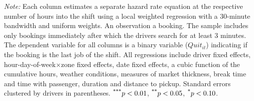 \documentclass[reviewmode]{restat}
\begin{document}
\begin{table}[]
	\begin{tablenotes}
		\small
        \textit{Note:} Each column estimates a separate hazard rate equation at the respective number of hours into the shift using a local weighted regression with a 30-minute bandwidth and uniform weights. An observation a booking. The sample includes only bookings immediately after which the drivers search for at least 3 minutes. The dependent variable for all columns is a binary variable ($Quit_{it}$) indicating if the booking is the last job of the shift. All regressions include driver fixed effects, hour-day-of-week\(\times\)zone fixed effects, date fixed effects, a cubic function of the cumulative hours, weather conditions, measures of market thickness, break time and time with passenger, duration and distance to pickup. Standard errors clustered by drivers in parentheses. $\textsuperscript{***}p < 0.01$, $\textsuperscript{**}p < 0.05$, $\textsuperscript{*}p < 0.10$. 
	\end{tablenotes}
\end{table}
\end{document}
